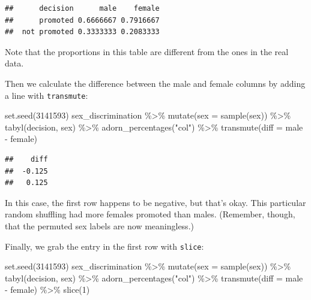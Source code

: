 \documentclass[
]{book}
\newenvironment{Shaded}{\begin{snugshade}}{\end{snugshade}}
\newcommand{\AttributeTok}[1]{\textcolor[rgb]{0.77,0.63,0.00}{#1}}
\newcommand{\DecValTok}[1]{\textcolor[rgb]{0.00,0.00,0.81}{#1}}
\newcommand{\FunctionTok}[1]{\textcolor[rgb]{0.00,0.00,0.00}{#1}}
\newcommand{\NormalTok}[1]{#1}
\newcommand{\SpecialCharTok}[1]{\textcolor[rgb]{0.00,0.00,0.00}{#1}}
\newcommand{\StringTok}[1]{\textcolor[rgb]{0.31,0.60,0.02}{#1}}
\begin{document}
\begin{verbatim}
##      decision      male    female
##      promoted 0.6666667 0.7916667
##  not promoted 0.3333333 0.2083333
\end{verbatim}

Note that the proportions in this table are different from the ones in the real data.

Then we calculate the difference between the male and female columns by adding a line with \texttt{transmute}:

\begin{Shaded}
\begin{Highlighting}[]
\FunctionTok{set.seed}\NormalTok{(}\DecValTok{3141593}\NormalTok{)}
\NormalTok{sex\_discrimination }\SpecialCharTok{\%\textgreater{}\%}
    \FunctionTok{mutate}\NormalTok{(}\AttributeTok{sex =} \FunctionTok{sample}\NormalTok{(sex)) }\SpecialCharTok{\%\textgreater{}\%}
    \FunctionTok{tabyl}\NormalTok{(decision, sex) }\SpecialCharTok{\%\textgreater{}\%}
    \FunctionTok{adorn\_percentages}\NormalTok{(}\StringTok{"col"}\NormalTok{) }\SpecialCharTok{\%\textgreater{}\%}
    \FunctionTok{transmute}\NormalTok{(}\AttributeTok{diff =}\NormalTok{ male }\SpecialCharTok{{-}}\NormalTok{ female)}
\end{Highlighting}
\end{Shaded}

\begin{verbatim}
##    diff
##  -0.125
##   0.125
\end{verbatim}

In this case, the first row happens to be negative, but that's okay. This particular random shuffling had more females promoted than males. (Remember, though, that the permuted sex labels are now meaningless.)

Finally, we grab the entry in the first row with \texttt{slice}:

\begin{Shaded}
\begin{Highlighting}[]
\FunctionTok{set.seed}\NormalTok{(}\DecValTok{3141593}\NormalTok{)}
\NormalTok{sex\_discrimination }\SpecialCharTok{\%\textgreater{}\%}
    \FunctionTok{mutate}\NormalTok{(}\AttributeTok{sex =} \FunctionTok{sample}\NormalTok{(sex)) }\SpecialCharTok{\%\textgreater{}\%}
    \FunctionTok{tabyl}\NormalTok{(decision, sex) }\SpecialCharTok{\%\textgreater{}\%}
    \FunctionTok{adorn\_percentages}\NormalTok{(}\StringTok{"col"}\NormalTok{) }\SpecialCharTok{\%\textgreater{}\%}
    \FunctionTok{transmute}\NormalTok{(}\AttributeTok{diff =}\NormalTok{ male }\SpecialCharTok{{-}}\NormalTok{ female) }\SpecialCharTok{\%\textgreater{}\%}
    \FunctionTok{slice}\NormalTok{(}\DecValTok{1}\NormalTok{)}
\end{Highlighting}
\end{Shaded}
\end{document}
